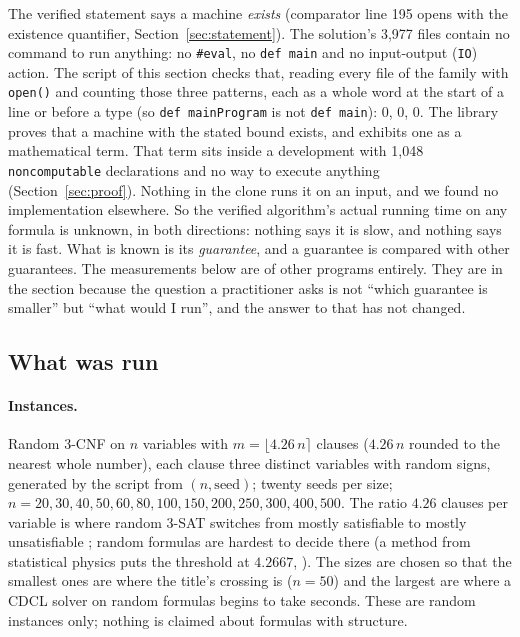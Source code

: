 The verified statement says a machine \emph{exists} (comparator line 195
opens with the existence quantifier, Section~\ref{sec:statement}). The
solution's 3,977 files contain no command to run anything: no
\texttt{\#eval}, no \texttt{def main} and no input-output (\texttt{IO})
action. The
script of this section checks that, reading every file of the family
with \texttt{open()} and counting those three patterns, each as a whole
word at the start of a line or before a type (so \texttt{def mainProgram}
is not \texttt{def main}): 0, 0, 0. The
library proves that a machine with the stated bound exists, and exhibits
one as a mathematical term. That term sits inside a development with 1,048
\texttt{noncomputable} declarations and no way to execute anything
(Section~\ref{sec:proof}). Nothing in the clone runs it on an input, and
we found no implementation elsewhere. So the verified algorithm's actual
running time on any formula is unknown, in both directions: nothing says
it is slow, and nothing says it is fast. What is known is its
\emph{guarantee}, and a guarantee is compared with other guarantees. The
measurements below are of other programs entirely. They are in the
section because the question a practitioner asks is not ``which
guarantee is smaller'' but ``what would I run'', and the answer to that
has not changed.

\subsection{What was run}
\label{sec:practitioner-setup}

\paragraph{Instances.} Random 3-CNF on $n$ variables with $m = \lfloor
4.26\,n \rceil$ clauses ($4.26\,n$ rounded to the nearest whole number), each clause three distinct variables with
random signs, generated by the script from $(n, \mathrm{seed})$; twenty
seeds per size; $n = 20, 30, 40, 50, 60, 80, 100, 150, 200, 250, 300,
400, 500$. The ratio $4.26$ clauses per variable is where random 3-SAT
switches from mostly satisfiable to mostly unsatisfiable
\citep{Selman1996Hard}; random formulas are hardest to decide there
(a method from statistical physics puts the threshold at $4.2667$, \citealp{Mertens2006Threshold}). The sizes are chosen so that the
smallest ones are where the title's crossing is ($n = 50$) and the
largest are where a CDCL solver on random formulas begins to take
seconds. These are random instances only; nothing is claimed about
formulas with structure.


